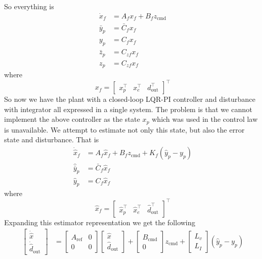 So everything is
\begin{align*}
  \dot{x}_{f}&=A_{f}x_{f}+B_{f}z_{\text{cmd}} \\
  \bar{y}_{p}&=\bar{C}_{f}x_{f} \\
  y_{p}&=C_{f}x_{f} \\
  \bar{z}_{p}&=C_{zf}x_{f} \\
  z_{p}&=C_{zf}x_{f}
\end{align*}
where
\begin{equation*}
  x_{f}=
  \begin{bmatrix}
    x_{p}^{\top} & x_{e}^{\top} & d_{\text{out}}^{\top}
  \end{bmatrix}^{\top}
\end{equation*}
So now we have the plant with a closed-loop LQR-PI controller and disturbance with integrator all expressed in a single system.
The problem is that we cannot implement the above controller as the state $x_{p}$ which was used in the control law is unavailable.
We attempt to estimate not only this state, but also the error state and disturbance.
That is
\begin{align*}
  \dot{\hat{x}}_{f}&=A_{f}\hat{x}_{f}+B_{f}z_{\text{cmd}}+K_{f}(\hat{y}_{p}-y_{p}) \\
  \hat{\bar{y}}_{p}&=\bar{C}_{f}\hat{x}_{f} \\
  \hat{y}_{p}&=C_{f}\hat{x}_{f}
\end{align*}
where
\begin{equation*}
  \hat{x}_{f}=
  \begin{bmatrix}
    \hat{x}_{p}^{\top} & \hat{x}_{e}^{\top} & \hat{d}_{\text{out}}^{\top}
  \end{bmatrix}^{\top}
\end{equation*}
Expanding this estimator representation we get the following
\begin{align*}
  \begin{bmatrix}
    \dot{\hat{x}} \\
    \dot{\hat{d}}_{\text{out}}
  \end{bmatrix}&=
  \begin{bmatrix}
    A_{\text{ref}} & 0 \\
    0 & 0
  \end{bmatrix}
  \begin{bmatrix}
    \hat{x} \\
    \hat{d}_{\text{out}}
  \end{bmatrix}+
  \begin{bmatrix}
    B_{\text{cmd}} \\
    0
  \end{bmatrix}z_{\text{cmd}}+
  \begin{bmatrix}
    L_{v} \\
    L_{I}
  \end{bmatrix}(\hat{y}_{p}-y_{p})
\end{align*}
